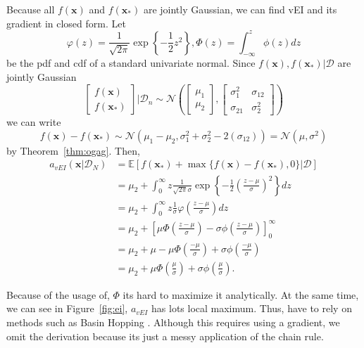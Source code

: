Because all $f(\mathbf{x})$ and $f(\mathbf{x}_*)$ are jointly Gaussian, we can find vEI and its gradient in closed form.
Let
\begin{equation*}
    \varphi(z) = \frac{ 1 }{ \sqrt{ 2 \pi } } \exp \left\{ -\frac12 z^2 \right\},
    \Phi(z) = \int_{-\infty}^{z} \phi(z) dz
\end{equation*}
be the pdf and cdf of a standard univariate normal.
Since $f(\mathbf{x}), f(\mathbf{x}_*) | \mathcal{D}$ are jointly Gaussian
\begin{equation*}
    \begin{bmatrix}
        f(\mathbf{x}) \\
        f(\mathbf{x}_*)
    \end{bmatrix}
    | \mathcal{D}_n
    \sim \mathcal{N}\left(
    \begin{bmatrix}
            \mu_1 \\
            \mu_2
        \end{bmatrix}
    ,
    \begin{bmatrix}
            \sigma_{1}^2 & \sigma_{12} \\
            \sigma_{21} & \sigma^2_2
        \end{bmatrix}
    \right)
\end{equation*}
we can write
\begin{equation*}
    f(\mathbf{x}) - f(\mathbf{x}_*) \sim \mathcal{N}(\mu_1 - \mu_2, \sigma_1^2 + \sigma_2^2 - 2(\sigma_{12}))
    = \mathcal{N}(\mu, \sigma^2)
\end{equation*}
by Theorem~\ref{thm:ogag}.
Then,
\begin{align*}
    a_{vEI}(\mathbf{x} | \mathcal{D}_N)
    & =  \mathbb{E}[f(\mathbf{x}_*) + \max \{  f(\mathbf{x}) - f(\mathbf{x}_*), 0 \} | \mathcal{D}] \\
    & = \mu_2 + \int_{0}^\infty z \frac{ 1 }{ \sqrt{2 \pi } \sigma} \exp \left\{ -\frac12 \left(\frac{ z - \mu }{ \sigma }\right)^2 \right\} dz \\
    & = \mu_2 + \int_{0}^\infty z \frac{ 1 }{ \sigma } \varphi\left(\frac{ z - \mu }{ \sigma }\right) dz \\
    & = \mu_2 + \left[ \mu \Phi\left(\frac{ z - \mu }{ \sigma }\right) - \sigma \phi\left(\frac{ z - \mu }{ \sigma }\right)\right]_{0}^{\infty} \\
    & = \mu_2 +  \mu - \mu \Phi\left(\frac{ -\mu }{ \sigma }\right) + \sigma \phi\left(\frac{ -\mu }{ \sigma }\right) \\
    & = \mu_2 + \mu \Phi\left(\frac{ \mu }{ \sigma }\right) + \sigma \phi\left(\frac{ \mu }{ \sigma }\right).
\end{align*}

Because of the usage of, $\Phi$ its hard to maximize it analytically.
At the same time, we can see in Figure~\ref{fig:ei}, $a_{vEI}$ has lots local maximum.
Thus, have to rely on methods such as Basin Hopping \cite{wales1997}.
Although this requires using a gradient, we omit the derivation because its just a messy application of the chain rule.


